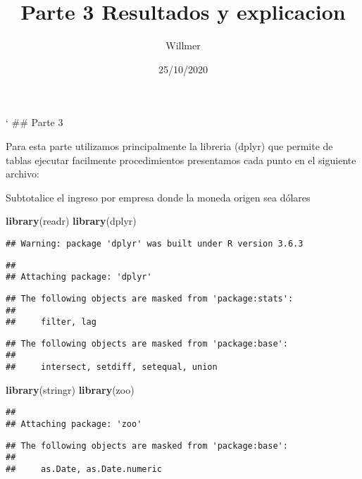 \documentclass[]{article}
\title{Parte 3 Resultados y explicacion}
\author{Willmer}
\date{25/10/2020}
\newenvironment{Shaded}{\begin{snugshade}}{\end{snugshade}}
\newcommand{\KeywordTok}[1]{\textcolor[rgb]{0.13,0.29,0.53}{\textbf{#1}}}
\newcommand{\NormalTok}[1]{#1}
\begin{document}
\maketitle

` \#\# Parte 3

Para esta parte utilizamos principalmente la libreria (dplyr) que
permite de tablas ejecutar facilmente procedimientos presentamos cada
punto en el siguiente archivo:

Subtotalice el ingreso por empresa donde la moneda origen sea dólares

\begin{Shaded}
\begin{Highlighting}[]
\KeywordTok{library}\NormalTok{(readr)}
\KeywordTok{library}\NormalTok{(dplyr)}
\end{Highlighting}
\end{Shaded}

\begin{verbatim}
## Warning: package 'dplyr' was built under R version 3.6.3
\end{verbatim}

\begin{verbatim}
## 
## Attaching package: 'dplyr'
\end{verbatim}

\begin{verbatim}
## The following objects are masked from 'package:stats':
## 
##     filter, lag
\end{verbatim}

\begin{verbatim}
## The following objects are masked from 'package:base':
## 
##     intersect, setdiff, setequal, union
\end{verbatim}

\begin{Shaded}
\begin{Highlighting}[]
\KeywordTok{library}\NormalTok{(stringr)}
\KeywordTok{library}\NormalTok{(zoo)}
\end{Highlighting}
\end{Shaded}

\begin{verbatim}
## 
## Attaching package: 'zoo'
\end{verbatim}

\begin{verbatim}
## The following objects are masked from 'package:base':
## 
##     as.Date, as.Date.numeric
\end{verbatim}
\end{document}
